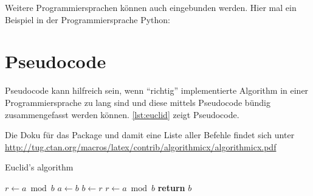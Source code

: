 \pagebreak
Weitere Programmiersprachen können auch eingebunden werden. Hier mal ein Beispiel in der Programmiersprache Python:


\clearpage %

\section{Pseudocode}
Pseudocode kann hilfreich sein, wenn \enquote{richtig} implementierte Algorithm in einer Programmiersprache zu lang sind und diese mittels Pseudocode bündig zusammengefasst werden können. \autoref{lst:euclid} zeigt Pseudocode.

Die Doku für das Package und damit eine Liste aller Befehle findet sich unter \newline
\url{http://tug.ctan.org/macros/latex/contrib/algorithmicx/algorithmicx.pdf}

\begin{algorithm}
	\caption{Euclid's algorithm}\label{lst:euclid}
	\begin{algorithmic}[1]
			\State $r\gets a\bmod b$
				\State $a\gets b$
				\State $b\gets r$
				\State $r\gets a\bmod b$
			\EndWhile\label{euclidendwhile}
			\State \textbf{return} $b$
		\EndProcedure
	\end{algorithmic}
\end{algorithm}

